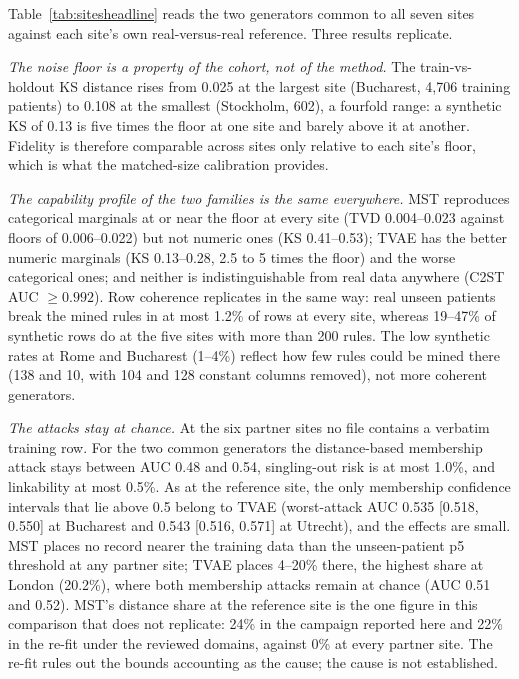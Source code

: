 \documentclass[11pt,a4paper]{article}
\begin{document}
Table~\ref{tab:sitesheadline} reads the two generators common to all seven sites
against each site's own real-versus-real reference. Three results replicate.

\emph{The noise floor is a property of the cohort, not of the method.} The
train-vs-holdout KS distance rises from 0.025 at the largest site (Bucharest,
4{,}706 training patients) to 0.108 at the smallest (Stockholm, 602), a fourfold
range: a synthetic KS of 0.13 is five times the floor at one site and barely above
it at another. Fidelity is therefore comparable across sites only relative to each
site's floor, which is what the matched-size calibration provides.

\emph{The capability profile of the two families is the same everywhere.} MST
reproduces categorical marginals at or near the floor at every site (TVD
0.004--0.023 against floors of 0.006--0.022) but not numeric ones (KS 0.41--0.53);
TVAE has the better numeric marginals (KS 0.13--0.28, 2.5 to 5 times the floor) and
the worse categorical ones; and neither is indistinguishable from real data
anywhere (C2ST AUC $\geq 0.992$). Row coherence replicates in the same way: real
unseen patients break the mined rules in at most 1.2\% of rows at every site,
whereas 19--47\% of synthetic rows do at the five sites with more than 200 rules.
The low synthetic rates at Rome and Bucharest (1--4\%) reflect how few rules could
be mined there (138 and 10, with 104 and 128 constant columns removed), not more
coherent generators.

\emph{The attacks stay at chance.} At the six partner sites no file contains a
verbatim training row. For the two common generators the distance-based
membership attack stays between AUC 0.48 and 0.54, singling-out risk is at most
1.0\%, and linkability at most 0.5\%. As at the reference site, the only
membership confidence intervals that lie above 0.5 belong to TVAE (worst-attack
AUC 0.535 [0.518, 0.550] at Bucharest and 0.543 [0.516, 0.571] at Utrecht), and
the effects are small. MST places no record
nearer the training data than the unseen-patient p5 threshold at any partner
site; TVAE places 4--20\% there, the highest share at London (20.2\%), where both
membership attacks remain at chance (AUC 0.51 and 0.52). MST's distance share
at the reference site is the one figure in this comparison that does not
replicate: 24\% in the campaign reported here and 22\% in the re-fit under the
reviewed domains, against 0\% at every partner site. The re-fit rules out the
bounds accounting as the cause; the cause is not established.
\end{document}
